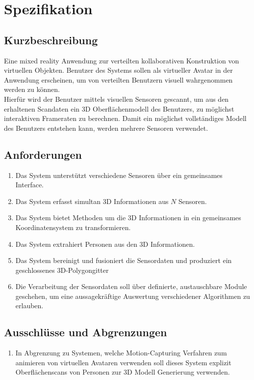 \section{Spezifikation}

\subsection{Kurzbeschreibung}
Eine mixed reality Anwendung zur verteilten kollaborativen Konstruktion von virtuellen Objekten. Benutzer des Systems sollen als virtueller Avatar in der Anwendung erscheinen, um von verteilten Benutzern visuell wahrgenommen werden zu können.\\
Hierfür wird der Benutzer mittels visuellen Sensoren gescannt, um aus den erhaltenen Scandaten ein 3D Oberflächenmodell des Benutzers, zu möglichst interaktiven Frameraten zu berechnen. Damit ein möglichst vollständiges Modell des Benutzers entstehen kann, werden mehrere Sensoren verwendet.

\subsection{Anforderungen}

\begin{enumerate}
	\item Das System unterstützt verschiedene Sensoren über ein gemeinsames Interface.
	\item Das System erfasst simultan 3D Informationen aus $N$ Sensoren.
	\item Das System bietet Methoden um die 3D Informationen in ein gemeinsames Koordinatensystem zu transformieren.
	\item Das System extrahiert Personen aus den 3D Informationen.
	\item Das System bereinigt und fusioniert die Sensordaten und produziert ein geschlossenes 3D-Polygongitter
	\item Die Verarbeitung der Sensordaten soll über definierte, austauschbare Module geschehen, um eine aussagekräftige Auswertung verschiedener Algorithmen zu erlauben.
\end{enumerate}

\subsection{Ausschlüsse und Abgrenzungen}

\begin{enumerate}
	\item In Abgrenzung zu Systemen, welche Motion-Capturing Verfahren zum animieren von virtuellen Avataren verwenden soll dieses System explizit Oberflächenscans von Personen zur 3D Modell Generierung verwenden.
\end{enumerate}

